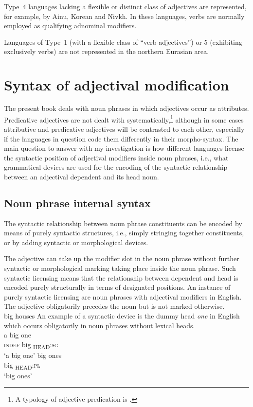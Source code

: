 Type~4 languages lacking a flexible or distinct class of adjectives are represented, for example, by Ainu, Korean and Nivkh. In these languages, verbs are normally employed as qualifying adnominal modifiers.

Languages of Type~1 (with a flexible class of “verb-adjectives”) or 5 (exhibiting exclusively verbs) are not represented in the northern Eurasian area.

\section{Syntax of adjectival modification}
The present book deals with noun phrases in which adjectives occur as attributes. Predicative adjectives are not dealt with systematically,\footnote{A typology of adjective predication is \citet{wetzer1996}.} although in some cases attributive and predicative adjectives will be contrasted to each other, especially if the languages in question code them differently in their morpho-syntax. The main question to answer with my investigation is how different languages license the syntactic position of adjectival modifiers inside noun phrases, i.e., what grammatical devices are used for the encoding of the syntactic relationship between an adjectival dependent and its head noun. 

\subsection{Noun phrase internal syntax}
The syntactic relationship between noun phrase constituents can be encoded by means of purely syntactic structures, i.e., simply stringing together constituents, or by adding syntactic or morphological devices. 

The adjective can take up the modifier slot in the noun phrase without further syntactic or morphological marking taking place inside the noun phrase. Such syntactic licensing means that the relationship between dependent and head is encoded purely structurally in terms of designated positions. An instance of purely syntactic licensing are noun phrases with adjectival modifiers in English. The adjective obligatorily precedes the noun but is not marked otherwise.
\ea 
{}\\
big houses
\z
An example of a syntactic device is the dummy head \textit{one} in English which occurs obligatorily in noun phrases without lexical heads.
\ea
{}\\
\ea
\gll 	a big one\\
   	\textsc{indef} big \textsubscript{\rm HEAD}\textsc{:sg}\\
\glt ‘a big one’
\ex
\gll	big ones\\
    	big \textsubscript{\rm HEAD}\textsc{:pl}\\
\glt ‘big ones’
\z
\z

